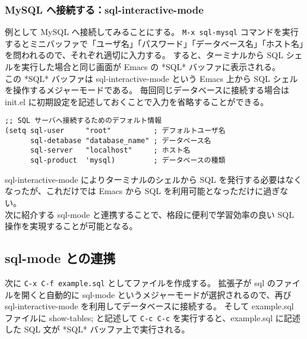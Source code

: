 \subsubsection{MySQL へ接続する：sql-interactive-mode}
例として MySQL へ接続してみることにする。
\texttt{M-x sql-mysql} コマンドを実行するとミニバッファで「ユーザ名」「パスワード」「データベース名」「ホスト名」を問われるので、それぞれ適切に入力する。
すると、ターミナルから SQL シェルを実行した場合と同じ画面が Emacs の *SQL* バッファに表示される。\\

この *SQL* バッファは sql-interactive-mode という Emacs 上から SQL シェルを操作するメジャーモードである。
毎回同じデータベースに接続する場合は init.el に初期設定を記述しておくことで入力を省略することができる。
\begin{mdframed}[roundcorner=0.50zw,leftmargin=3.00zw,rightmargin=3.00zw,skipabove=0.40zw,skipbelow=0.40zw,innertopmargin=4.00pt,innerbottommargin=4.00pt,innerleftmargin=5.00pt,innerrightmargin=5.00pt,linecolor=gray!020,linewidth=0.50pt,backgroundcolor=gray!20]
\begin{verbatim}
;; SQL サーバへ接続するためのデフォルト情報
(setq sql-user     "root"          ; デフォルトユーザ名
      sql-detabase "database_name" ; データベース名
      sql-server   "localhost"     ; ホスト名
      sql-product  'mysql)         ; データベースの種類
\end{verbatim}
\end{mdframed}
sql-interactive-mode によりターミナルのシェルから SQL を発行する必要はなくなったが、これだけでは Emacs から SQL を利用可能となっただけに過ぎない。\\

次に紹介する sql-mode と連携することで、格段に便利で学習効率の良い SQL 操作を実現することが可能となる。
\subsection{sql-mode との連携}
次に \texttt{C-x C-f example.sql} としてファイルを作成する。
拡張子が sql のファイルを開くと自動的に sql-mode というメジャーモードが選択されるので、再び sql-interactive-mode を利用してデータベースに接続する。
そして example.sql ファイルに show-tables; と記述して \texttt{C-c C-c} を実行すると、example.sql に記述した SQL 文が *SQL* バッファ上で実行される。\\

